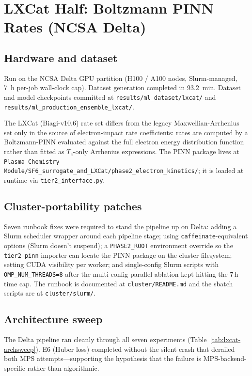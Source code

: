 \documentclass[11pt,a4paper]{article}
\begin{document}
\section{LXCat Half: Boltzmann PINN Rates (NCSA Delta)}
\label{sec:lxcat}

\subsection{Hardware and dataset}
Run on the NCSA Delta GPU partition (H100 / A100 nodes, Slurm-managed,
\SI{7}{\hour} per-job wall-clock cap).  Dataset generation completed
in \SI{93.2}{\minute}.  Dataset and model checkpoints committed at
\texttt{results/ml\_dataset/lxcat/} and
\texttt{results/ml\_production\_ensemble\_lxcat/}.

The LXCat (Biagi-v10.6) rate set differs from the legacy
Maxwellian-Arrhenius set only in the source of electron-impact rate
coefficients: rates are computed by a Boltzmann-PINN evaluated against
the full electron energy distribution function rather than fitted as
$T_e$-only Arrhenius expressions.  The PINN package lives at
\texttt{Plasma Chemistry Module/SF6\_surrogate\_and\_LXCat/phase2\_electron\_kinetics/};
it is loaded at runtime via \texttt{tier2\_interface.py}.

\subsection{Cluster-portability patches}
Seven runbook fixes were required to stand the pipeline up on Delta:
adding a Slurm scheduler wrapper around each pipeline stage; using
\texttt{caffeinate}-equivalent options (Slurm doesn't suspend); a
\texttt{PHASE2\_ROOT} environment override so the
\texttt{tier2\_pinn} importer can locate the PINN package on the
cluster filesystem; setting CUDA visibility per worker; and
single-config Slurm scripts with \texttt{OMP\_NUM\_THREADS=8} after
the multi-config parallel ablation kept hitting the 7\,h time cap.
The runbook is documented at \texttt{cluster/README.md} and the
sbatch scripts are at \texttt{cluster/slurm/}.

\subsection{Architecture sweep}
The Delta pipeline ran cleanly through all seven experiments
(Table~\ref{tab:lxcat-archsweep}).  E6 (Huber loss) completed without
the silent crash that derailed both MPS attempts---supporting the
hypothesis that the failure is MPS-backend-specific rather than
algorithmic.
\end{document}

